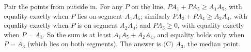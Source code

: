 Pair the points from outside in. For any $P$ on the line, $PA_1+PA_5\ge A_1A_5$, with equality exactly when $P$ lies on segment $A_1A_5$; similarly $PA_2+PA_4\ge A_2A_4$, with equality exactly when $P$ is on segment $A_2A_4$; and $PA_3\ge0$, with equality exactly when $P=A_3$. So the sum is at least $A_1A_5+A_2A_4$, and equality holds only when $P=A_3$ (which lies on both segments). The answer is $\boxed{\text{(C) } A_3}$, the median point.
